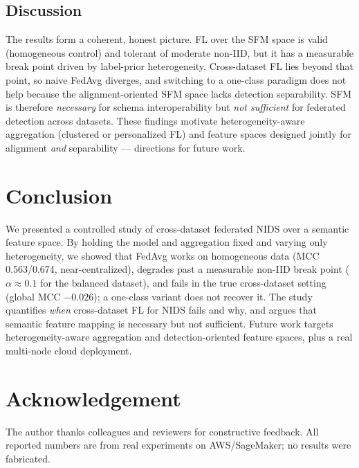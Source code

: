 \documentclass[11pt,a4paper]{article}
\begin{document}
\subsection{Discussion}
The results form a coherent, honest picture. FL over the SFM space is valid
(homogeneous control) and tolerant of moderate non-IID, but it has a measurable
break point driven by label-prior heterogeneity. Cross-dataset FL lies beyond
that point, so naive FedAvg diverges, and switching to a one-class paradigm does
not help because the alignment-oriented SFM space lacks detection separability.
SFM is therefore \emph{necessary} for schema interoperability but \emph{not
sufficient} for federated detection across datasets. These findings motivate
heterogeneity-aware aggregation (clustered or personalized FL) and feature spaces
designed jointly for alignment \emph{and} separability --- directions for future
work.

\section{Conclusion}
We presented a controlled study of cross-dataset federated NIDS over a semantic
feature space. By holding the model and aggregation fixed and varying only
heterogeneity, we showed that FedAvg works on homogeneous data (MCC 0.563/0.674,
near-centralized), degrades past a measurable non-IID break point
(\(\alpha\approx0.1\) for the balanced dataset), and fails in the true
cross-dataset setting (global MCC \(-0.026\)); a one-class variant does not
recover it. The study quantifies \emph{when} cross-dataset FL for NIDS fails and
why, and argues that semantic feature mapping is necessary but not sufficient.
Future work targets heterogeneity-aware aggregation and detection-oriented
feature spaces, plus a real multi-node cloud deployment.

\section*{Acknowledgement}
The author thanks colleagues and reviewers for constructive feedback. All
reported numbers are from real experiments on AWS/SageMaker; no results were
fabricated.
\end{document}
